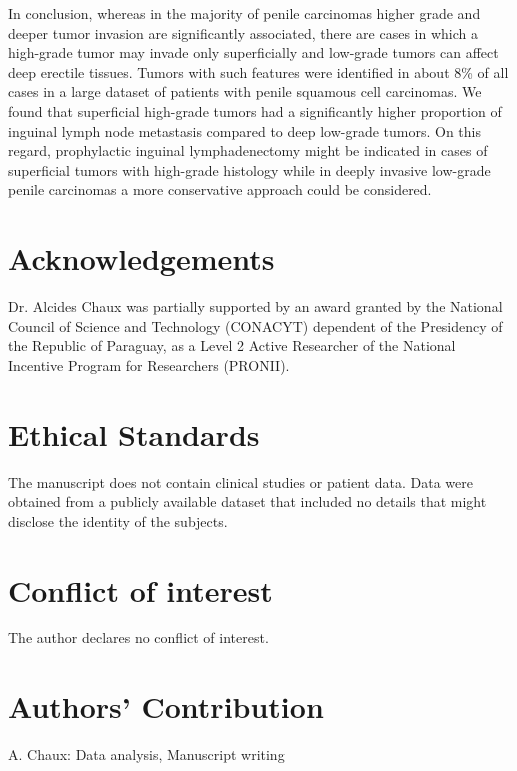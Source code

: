 \documentclass[11pt,letterpaper]{article}\usepackage[]{graphicx}\usepackage[]{color}
\begin{document}
\begin{multicols}{2}
In conclusion, whereas in the majority of penile carcinomas higher grade and deeper tumor invasion are significantly associated, there are cases in which a high-grade tumor may invade only superficially and low-grade tumors can affect deep erectile tissues. Tumors with such features were identified in about 8\% of all cases in a large dataset of patients with penile squamous cell carcinomas. We found that superficial high-grade tumors had a significantly higher proportion of inguinal lymph node metastasis compared to deep low-grade tumors. On this regard, prophylactic inguinal lymphadenectomy might be indicated in cases of superficial tumors with high-grade histology while in deeply invasive low-grade penile carcinomas a more conservative approach could be considered.

\section*{Acknowledgements}
Dr. Alcides Chaux was partially supported by an award granted by the National Council of Science and Technology (CONACYT) dependent of the Presidency of the Republic of Paraguay, as a Level 2 Active Researcher of the National Incentive Program for Researchers (PRONII).

\section*{Ethical Standards}
The manuscript does not contain clinical studies or patient data. Data were obtained from a publicly available dataset that included no details that might disclose the identity of the subjects.

\section*{Conflict of interest}
The author declares no conflict of interest.

\section*{Authors’ Contribution}
A. Chaux: Data analysis, Manuscript writing




\end{multicols}
\end{document}
